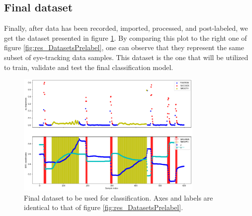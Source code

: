 
\subsection{Final dataset}

Finally, after data has been recorded, imported, processed, and post-labeled, we get the dataset presented in figure \ref{fig:res_DatasetFinal}. By comparing this plot to the right one of figure \ref{fig:res_DatasetsPrelabel}, one can observe that they represent the same subset of eye-tracking data samples. This dataset is the one that will be utilized to train, validate and test the final classification model.

\begin{figure}[h]
    \centering
    \includegraphics[width=0.8\textwidth]{Images/Dataset/DatasetFinal.png}
    \caption{Final dataset to be used for classification. Axes and labels are identical to that of figure \ref{fig:res_DatasetsPrelabel}.}
    \label{fig:res_DatasetFinal}
\end{figure}